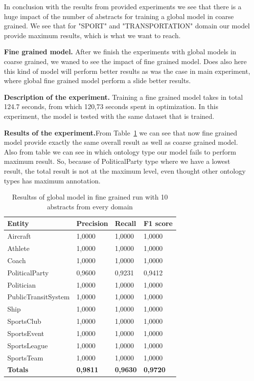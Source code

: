 \documentclass[thesis=M,english]{FITthesis}[2018/05/30]
\begin{document}
	In conclusion with the results from provided experiments we see that there is a huge impact of the number of abstracts for training a global model in coarse grained. We see that for "SPORT" and "TRANSPORTATION" domain our model provide maximum results, which is what we want to reach.


	\textbf{Fine grained model.} After we finish the experiments with global models in coarse grained, we waned to see the impact of fine grained model. Does also here this kind of model will perform better results as was the case in main experiment, where global fine grained model perform a slide better results.
	
	\textbf{Description of the experiment.} Training a fine grained model takes in total 124.7 seconds, from which 120,73 seconds spent in optimization. In this experiment, the model is tested with the same dataset that is trained.
	
	\textbf{Results of the experiment.}From Table~\ref{table:GlobalDomainWithAllAbstractsTop10Fine} we can see that now fine grained model provide exactly the same overall result as well as coarse grained model. Also from table we can see in which ontology type our model fails to perform maximum result. So, because of PoliticalParty type where we have a lowest result, the total result is not at the maximum level, even thought other ontology types has maximum annotation.
	  	
	\begin{table}[H]\centering
		\begin{tabular}{|l|l|l|l|}
			\hline {\textbf{Entity}} & {\textbf{Precision}} & {\textbf{Recall}} & {\textbf{F1 score}}\\\hline
				Aircraft & 1,0000 & 1,0000 & 1,0000\\
				Athlete & 1,0000 & 1,0000 & 1,0000\\
				Coach & 1,0000 & 1,0000 & 1,0000\\
				PoliticalParty & 0,9600 & 0,9231 & 0,9412\\
				Politician & 1,0000 & 1,0000 & 1,0000\\
				PublicTransitSystem & 1,0000 & 1,0000 & 1,0000\\
				Ship & 1,0000 & 1,0000 & 1,0000\\
				SportsClub & 1,0000 & 1,0000 & 1,0000\\
				SportsEvent & 1,0000 & 1,0000 & 1,0000\\
				SportsLeague & 1,0000 & 1,0000 & 1,0000\\
				SportsTeam & 1,0000 & 1,0000 & 1,0000\\\hline
				\textbf{Totals} & \textbf{0,9811} & \textbf{0,9630} & \textbf{0,9720}\\\hline
		\end{tabular}
		\caption{Resultss of global model in fine grained run with 10 abstracts from every domain \label{table:GlobalDomainWithAllAbstractsTop10Fine}}	
	\end{table}
\end{document}
